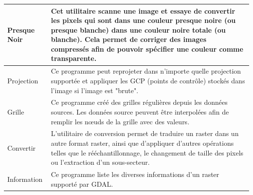 {\begin{longtable}{|p{3cm}|p{13cm}|}
\hline Presque Noir & Cet utilitaire scanne une image et essaye de convertir les pixels qui sont dans une couleur presque noire (ou presque blanche) dans une couleur noire totale (ou blanche). Cela permet de corriger des images compressés afin de pouvoir spécifier une couleur comme transparente.\\
\hline Projection & Ce programme peut reprojeter dans n'importe quelle projection supportée et appliquer les GCP (points de contrôle) stockés dans l'image si l'image est "brute". \\
\hline Grille & Ce programme créé des grilles régulières depuis les données sources. Les données source peuvent être interpolées afin de remplir les n\oe{}uds de la grille avec des valeurs.\\
\hline Convertir & L'utilitaire de conversion permet de traduire un raster dans un autre format raster, ainsi que d'appliquer d'autres opérations telles que le rééchantillonnage, le changement de taille des pixels ou l'extraction d'un sous-secteur.\\
\hline Information & Ce programme liste les diverses informations d'un raster supporté par GDAL.\\

\end{longtable}}
